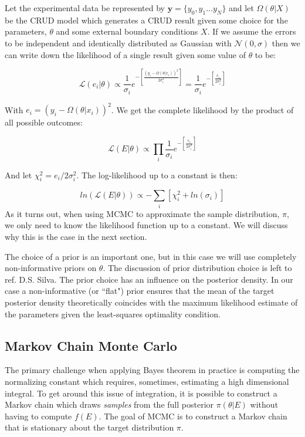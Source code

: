 \documentclass[10pt,a4paper]{report}
\begin{document}
Let the experimental data be represented by $\mathbf y =\{y_0, y_1... y_N\}$ and let $\Omega(\theta|X)$ be the CRUD model which generates a CRUD result given some choice for the parameters, $\theta$ and some external boundary conditions $X$.
If we assume the errors to be independent and identically distributed as Gaussian with $\mathcal N(0, \sigma) $ then we can write down the likelihood of a single result given some value of $\theta$ to be:

\begin{equation}
\mathcal L (e_i|\theta) \propto  \frac{1}{\sigma_i}  e^{-\left[ \frac{(y_i - \Omega(\theta|x_i))^2}{2\sigma_i^2} \right]} =  \frac{1}{\sigma_i}  e^{-\left[ \frac{e_i}{2\sigma_i^2} \right]}
\end{equation}

With $e_i = (y_i - \Omega(\theta|x_i))^2$.
We get the complete likelihood by the product of all possible outcomes:

\begin{equation}
\mathcal L (E|\theta) \propto \prod_i \frac{1}{\sigma_i}  e^{-\left[ \frac{e_i}{2\sigma_i^2} \right]}
\end{equation}

And let $\chi_i^2 = e_i / 2\sigma_i^2$.  The log-likelihood up to a constant is then:

\begin{equation}
ln(\mathcal L (E|\theta)) \propto -  \sum_i \left[ \chi_i^2 + ln(\sigma_i) \right]
\end{equation}
As it turns out, when using MCMC to approximate the sample distribution, $\pi$, we only need to know the likelihood function up to a constant.  We will discuss why this is the case in the next section.

The choice of a prior is an important one, but in this case we will use completely non-informative priors on $\theta$.  The discussion of prior distribution choice is left to ref. D.S. Silva.  The prior choice has an influence on the posterior density.  In our case a non-informative (or ``flat") prior ensures that the mean of the target posterior density theoretically coincides with the maximum likelihood estimate of the parameters given the least-squares optimality condition.

\subsection{Markov Chain Monte Carlo}

The primary challenge when applying Bayes theorem in practice is computing the normalizing constant which requires, sometimes, estimating a high dimensional integral.   To get around this issue of integration, it is possible to construct a Markov chain which draws \emph{samples} from the full posterior $\pi(\theta|E)$ without having to compute $f(E)$.    The goal of MCMC is to construct a Markov chain that is stationary about the target distribution $\pi$.
\end{document}
